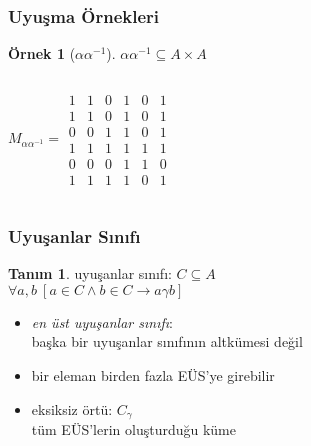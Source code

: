 \documentclass[dvipsnames]{beamer}
\theoremstyle{definition}
\newtheorem{tanim}[theorem]{Tanım}
\theoremstyle{example}
\newtheorem{ornek}[theorem]{Örnek}
\theoremstyle{plain}
\begin{document}
\begin{frame}
  \frametitle{Uyuşma Örnekleri}

  \begin{ornek}[$\alpha \alpha^{-1}$]
    $\alpha \alpha^{-1} \subseteq A \times A$

    \begin{columns}
      \[
        M_{\alpha \alpha^{-1}} =
          \begin{array}{|cccccc|}
            1  &  1  &  0  &  1  &  0  &  1\\
            1  &  1  &  0  &  1  &  0  &  1\\
            0  &  0  &  1  &  1  &  0  &  1\\
            1  &  1  &  1  &  1  &  1  &  1\\
            0  &  0  &  0  &  1  &  1  &  0\\
            1  &  1  &  1  &  1  &  0  &  1
          \end{array}
      \]

      \begin{center}
      \end{center}
    \end{columns}
  \end{ornek}
\end{frame}

\begin{frame}
  \frametitle{Uyuşanlar Sınıfı}

  \begin{tanim}
    \alert{uyuşanlar sınıfı}: $C \subseteq A$\\
      $\forall a,b~[a \in C \wedge b \in C \rightarrow a \gamma b]$
  \end{tanim}

  \pause
  \medskip
  \begin{itemize}
    \item \emph{en üst uyuşanlar sınıfı}:\\
      başka bir uyuşanlar sınıfının altkümesi değil

    \pause
    \item bir eleman birden fazla EÜS'ye girebilir

    \pause
    \medskip
    \item \alert{eksiksiz örtü}: $C_\gamma$\\
      tüm EÜS'lerin oluşturduğu küme
  \end{itemize}
\end{frame}
\end{document}

